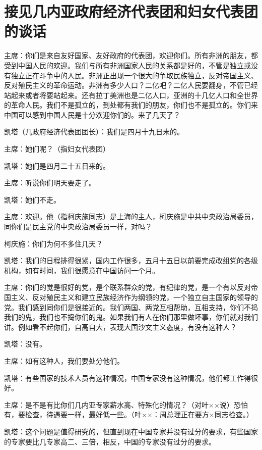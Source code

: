\section[接见几内亚政府经济代表团和妇女代表团的谈话（一九六二年五月三日）]{接见几内亚政府经济代表团和妇女代表团的谈话}


主席：你们是来自友好国家、友好政府的代表团，欢迎你们。所有非洲的朋友，都受到中国人民的欢迎。我们与所有非洲国家人民的关系都是好的，不管是独立或没有独立正在斗争中的人民。非洲正出现一个很大的争取民族独立，反对帝国主义、反对殖民主义的革命运动。非洲有多少人口？二亿吧？二亿人民要翻身，不管已经站起来或者将要站起来。还有拉丁美洲也是二亿人口，亚洲的十几亿人口和全世界的革命人民。我们不是孤立的，到处都有我们的朋友，你们也不是孤立的。你们来中国可以感到中国人民是十分欢迎你们的。来了几天了？

凯塔（几政府经济代表团团长）：我们是四月十九日末的。

主席：她们呢？（指妇女代表团）

凯塔：她们是四月二十五日来的。

主席：听说你们明天要走了。

凯塔：她们不走。

主席：欢迎。他（指柯庆施同志）是上海的主人，柯庆施是中共中央政治局委员，同你们是民主党的中央政治局委员一样，对吗？

柯庆施：你们为何不多住几天？

凯塔：我们的日程排得很紧，国内工作很多，五月十五日以前要完成改组党的各级机构，如有时间，我们很愿意在中国访问一个月。

主席：你们的觉是很好的党，是个联系群众的党，有纪律的党，是一个有以反对帝国主义、反对殖民主义和建立民族经济作为纲领的党，一个独立自主国家的领导的党。我们感到同你们是很接近的。我们两国、两党互相帮助，互相支持，你们不捣我们的鬼，我们也不捣你们的鬼。如果我们有人在你们那里做坏事，你们就对我们讲。例如看不起你们，自高自大，表现大国沙文主义态度，有没有这种人？

凯塔：没有。

主席：如有这种人，我们要处分他们。

凯塔：有些国家的技术人员有这种情况，中国专家没有这种情况，他们都工作得很好。

主席：是不是有比你们几内亚专家薪水高、特殊化的情况？（对叶××说）恐怕有，要检查，待遇要一样，最好低一些。（叶××：周总理正在要方×同志检查。）

凯塔：这个问题是值得研究的，但直到现在中国专家并没有过分的要求，有些国家的专家要比几专家高二、三倍，相反，中国的专家没有过分的要求。

